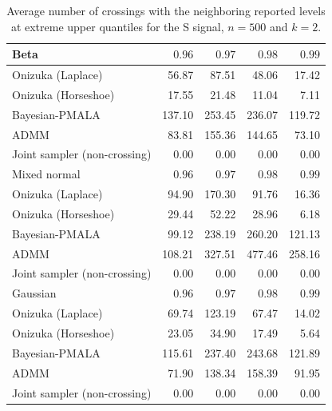 \begin{table}[!htbp]
\centering
\small
\caption{Average number of crossings with the neighboring reported levels at extreme upper quantiles for the S signal, $n=500$ and $k=2$.}
\label{tab:s_ext_upper_cross_nb}
\begin{tabular}{lrrrr}
\toprule
Beta & $0.96$ & $0.97$ & $0.98$ & $0.99$ \\
\midrule
Onizuka (Laplace) & 56.87 & 87.51 & 48.06 & 17.42 \\
Onizuka (Horseshoe) & 17.55 & 21.48 & 11.04 & 7.11 \\
Bayesian-PMALA & 137.10 & 253.45 & 236.07 & 119.72 \\
ADMM & 83.81 & 155.36 & 144.65 & 73.10 \\
Joint sampler (non-crossing) & 0.00 & 0.00 & 0.00 & 0.00 \\
\midrule
Mixed normal & $0.96$ & $0.97$ & $0.98$ & $0.99$ \\
\midrule
Onizuka (Laplace) & 94.90 & 170.30 & 91.76 & 16.36 \\
Onizuka (Horseshoe) & 29.44 & 52.22 & 28.96 & 6.18 \\
Bayesian-PMALA & 99.12 & 238.19 & 260.20 & 121.13 \\
ADMM & 108.21 & 327.51 & 477.46 & 258.16 \\
Joint sampler (non-crossing) & 0.00 & 0.00 & 0.00 & 0.00 \\
\midrule
Gaussian & $0.96$ & $0.97$ & $0.98$ & $0.99$ \\
\midrule
Onizuka (Laplace) & 69.74 & 123.19 & 67.47 & 14.02 \\
Onizuka (Horseshoe) & 23.05 & 34.90 & 17.49 & 5.64 \\
Bayesian-PMALA & 115.61 & 237.40 & 243.68 & 121.89 \\
ADMM & 71.90 & 138.34 & 158.39 & 91.95 \\
Joint sampler (non-crossing) & 0.00 & 0.00 & 0.00 & 0.00 \\
\bottomrule
\end{tabular}
\end{table}
